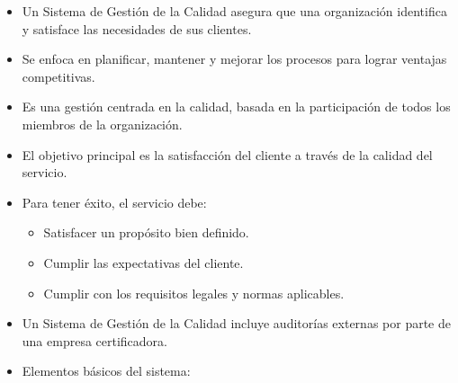\documentclass{article} %
\begin{document}
\begin{itemize}[label={},left=0pt,align=parleft]
    \item \begin{highlightbox}[levelone] Un Sistema de Gestión de la Calidad asegura que una organización identifica y satisface las necesidades de sus clientes. \end{highlightbox}
    \item \begin{highlightbox}[levelone] Se enfoca en planificar, mantener y mejorar los procesos para lograr ventajas competitivas. \end{highlightbox}
    \item \begin{highlightbox}[levelone] Es una gestión centrada en la calidad, basada en la participación de todos los miembros de la organización. \end{highlightbox}
    \item \begin{highlightbox}[levelone] El objetivo principal es la satisfacción del cliente a través de la calidad del servicio. \end{highlightbox}
    \item \begin{highlightbox}[levelone] Para tener éxito, el servicio debe: \end{highlightbox}
    \begin{itemize}[label={},left=1em,align=parleft]
        \item \begin{highlightbox}[leveltwo] Satisfacer un propósito bien definido. \end{highlightbox}
        \item \begin{highlightbox}[leveltwo] Cumplir las expectativas del cliente. \end{highlightbox}
        \item \begin{highlightbox}[leveltwo] Cumplir con los requisitos legales y normas aplicables. \end{highlightbox}
    \end{itemize}
    \item \begin{highlightbox}[levelone] Un Sistema de Gestión de la Calidad incluye auditorías externas por parte de una empresa certificadora. \end{highlightbox}
    \item \begin{highlightbox}[levelone] Elementos básicos del sistema: \end{highlightbox}

\end{itemize}
\end{document}
